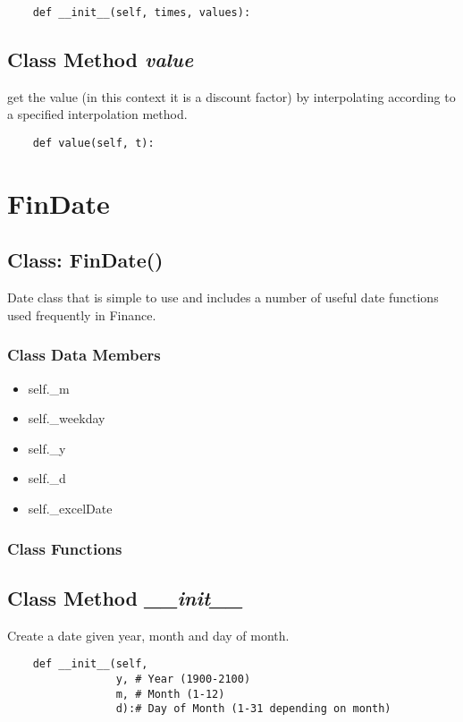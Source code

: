 \documentclass[twoside,11pt]{book}
\begin{document}
\begin{lstlisting}
    def __init__(self, times, values):
\end{lstlisting}

\subsection{Class Method {\it value}}
get the value (in this context it is a discount factor) by interpolating according to a specified interpolation method. 

\begin{lstlisting}
    def value(self, t):
\end{lstlisting}

\newpage
\section{FinDate}

\subsection{Class: FinDate()}
Date class that is simple to use and includes a number of useful date functions used frequently in Finance. 

\subsubsection{Class Data Members}
\begin{itemize}
\item{self.\_m}
\item{self.\_weekday}
\item{self.\_y}
\item{self.\_d}
\item{self.\_excelDate}
\end{itemize}

\subsubsection{Class Functions}

\subsection{Class Method {\it \_\_init\_\_}}
Create a date given year, month and day of month. 

\begin{lstlisting}
    def __init__(self, 
                 y, # Year (1900-2100)
                 m, # Month (1-12)
                 d):# Day of Month (1-31 depending on month)
\end{lstlisting}
\end{document}
